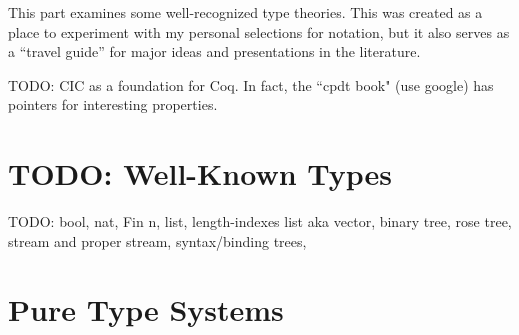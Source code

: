 \documentclass[11pt]{article} %
\theoremstyle{definition}
\theoremstyle{remark}
\begin{document}
This part examines some well-recognized type theories.
This was created as a place to experiment with my personal selections for notation, but it also serves as a ``travel guide'' for major ideas and presentations in the literature.

TODO: CIC as a foundation for Coq. In fact, the ``cpdt book" (use google) has pointers for interesting properties.

\section{TODO: Well-Known Types}

TODO: bool, nat, Fin n, list, length-indexes list aka vector, binary tree, rose tree, stream and proper stream, syntax/binding trees, 

\section{Pure Type Systems}
\label{sec:pure-type-systems}
\end{document}
